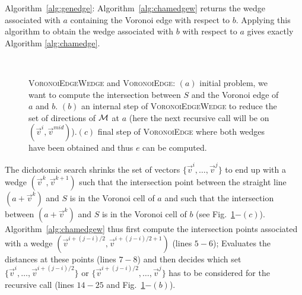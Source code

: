 \documentclass{llncs}
\begin{document}
Algorithm~\ref{alg:genedge}: Algorithm~\ref{alg:chamedgew} returns the
wedge associated with $a$ containing the Voronoi edge with respect to
$b$. Applying this algorithm to obtain the wedge associated with $b$ with respect to
$a$ gives exactly  Algorithm \ref{alg:chamedge}.
\begin{figure}[h]
  \begin{center}\scriptsize
    ~~~~~~~~~
    ~~~~~~~~~
  \end{center}
  \caption{\small \textsc{VoronoiEdgeWedge} and \textsc{VoronoiEdge}: $(a)$
    initial problem, we want to compute the intersection between $S$
    and the Voronoi edge of $a$ and $b$. $(b)$ an internal step of
    \textsc{VoronoiEdgeWedge} to reduce the set of directions of $\mathcal{M}$
    at $a$ (here the next recursive call will be on
    $(\vec{v}^i,\vec{v}^{mid})$).$(c)$ final step of
    \textsc{VoronoiEdge} where both wedges have been obtained and thus
    $e$ can be computed.}
  \label{fig:algo}
\end{figure}
The dichotomic search shrinks the set of vectors
$\{\vec{v}^i,\ldots,\vec{v}^j\}$ to end up with a wedge
$(\vec{v}^k,\vec{v}^{k+1})$ such that the intersection point between
the straight line $(a + \vec{v}^k)$ and $S$ is in the Voronoi cell of
$a$ and such that the intersection between $(a + \vec{v}^k)$ and $S$
is in the Voronoi cell of $b$ (see
Fig.~\ref{fig:algo}$-(c)$). Algorithm~\ref{alg:chamedgew} thus first
compute the intersection points associated with a wedge
$(\vec{v}^{i+(j-i)/2}, \vec{v}^{i+(j-i)/2+1})$ (lines $5-6$);
Evaluates the distances at these points (lines $7-8$) and then decides
which set $\{\vec{v}^i,\ldots,\vec{v}^{i+(j-i)/2}\}$ or
$\{\vec{v}^{i+(j-i)/2},\ldots,\vec{v}^j\}$ has to be considered for
the recursive call (lines $14-25$ and Fig.~\ref{fig:algo}$-(b)$).
\end{document}
